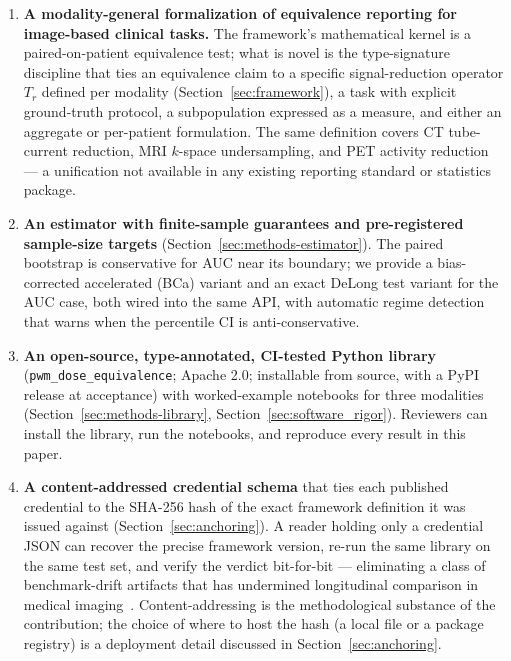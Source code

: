 \documentclass[twoside,11pt]{article}
\begin{document}
\begin{enumerate}
    \item \textbf{A modality-general formalization of equivalence reporting for image-based clinical tasks.} The framework's mathematical kernel is a paired-on-patient equivalence test; what is novel is the type-signature discipline that ties an equivalence claim to a specific signal-reduction operator $T_r$ defined per modality (Section~\ref{sec:framework}), a task with explicit ground-truth protocol, a subpopulation expressed as a measure, and either an aggregate or per-patient formulation. The same definition covers CT tube-current reduction, MRI $k$-space undersampling, and PET activity reduction --- a unification not available in any existing reporting standard or statistics package.

    \item \textbf{An estimator with finite-sample guarantees and pre-registered sample-size targets} (Section~\ref{sec:methods-estimator}). The paired bootstrap is conservative for AUC near its boundary; we provide a bias-corrected accelerated (BCa) variant and an exact DeLong test variant for the AUC case, both wired into the same API, with automatic regime detection that warns when the percentile CI is anti-conservative.

    \item \textbf{An open-source, type-annotated, CI-tested Python library} (\texttt{pwm\_dose\_equivalence}; Apache 2.0; installable from source, with a PyPI release at acceptance) with worked-example notebooks for three modalities (Section~\ref{sec:methods-library}, Section~\ref{sec:software_rigor}). Reviewers can install the library, run the notebooks, and reproduce every result in this paper.

    \item \textbf{A content-addressed credential schema} that ties each published credential to the SHA-256 hash of the exact framework definition it was issued against (Section~\ref{sec:anchoring}). A reader holding only a credential JSON can recover the precise framework version, re-run the same library on the same test set, and verify the verdict bit-for-bit --- eliminating a class of benchmark-drift artifacts that has undermined longitudinal comparison in medical imaging~\citep{wang2020deeplearningreview}. Content-addressing is the methodological substance of the contribution; the choice of where to host the hash (a local file or a package registry) is a deployment detail discussed in Section~\ref{sec:anchoring}.
\end{enumerate}
\end{document}
